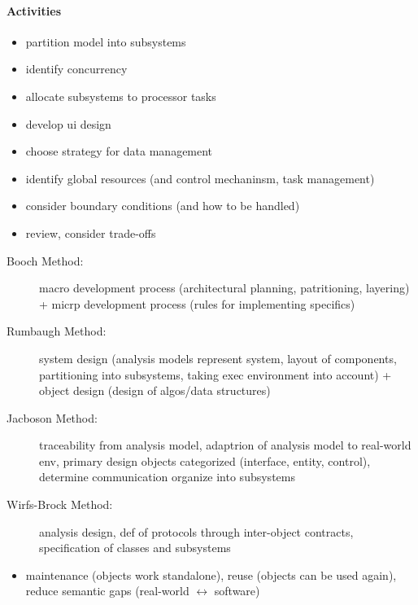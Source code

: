 \documentclass[a4paper, 10pt]{article}
\begin{document}
\paragraph*{Activities}
\begin{itemize}
	\item partition model into subsystems
	\item identify concurrency
	\item allocate subsystems to processor tasks
	\item develop ui design
	\item choose strategy for data management
	\item identify global resources (and control mechaninsm, task management)
	\item consider boundary conditions (and how to be handled)
	\item review, consider trade-offs
\end{itemize}
\begin{description}
	\item[Booch Method:] macro development process (architectural planning, patritioning, layering) + micrp development process (rules for implementing specifics)
	\item[Rumbaugh Method:] system design (analysis models represent system, layout of components, partitioning into subsystems, taking exec environment into account) + object design (design of algos/data structures)
	\item[Jacboson Method:] traceability from analysis model, adaptrion of analysis model to real-world env, primary design objects categorized (interface, entity, control), determine communication \follows organize into subsystems
	\item[Wirfs-Brock Method:] analysis \follows design, def of protocols through inter-object contracts, specification of classes and subsystems
\end{description}
\begin{itemize}
	\item maintenance (objects work standalone), reuse (objects can be used again), reduce semantic gaps (real-world $\leftrightarrow$ software)
\end{itemize}
\end{document}
